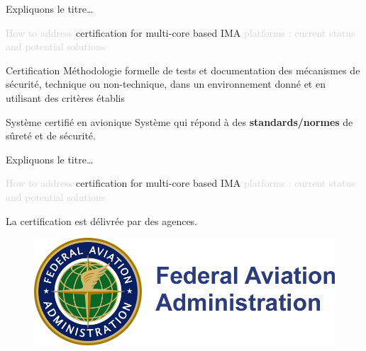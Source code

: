 \documentclass{beamer}
\begin{document}
\begin{frame}[t]{Expliquons le titre\ldots} 
  
  \begin{center}
    \begin{mdframed}[style=yellowbox]
      {\small\textcolor{lightgray}{How to address} certification for multi-core based IMA \textcolor{lightgray}{platforms :
       current status and potential solutions}}
       \end{mdframed}
  \end{center}
	
  	\begin{block}{Certification}
  		Méthodologie formelle de tests et documentation des mécanismes de sécurité,
		technique ou non-technique, dans un environnement donné et en utilisant des
		critères établis
  	\end{block}\pause

	\begin{block}{Système certifié en avionique}
	 Système qui répond à des \textbf{standards/normes} de sûreté et de sécurité.
	\end{block}


\end{frame}

\begin{frame}[t]{Expliquons le titre\ldots}
\begin{center}
    \begin{mdframed}[style=yellowbox]
      {\small\textcolor{lightgray}{How to address} certification for multi-core based IMA \textcolor{lightgray}{platforms :
       current status and potential solutions}}
       \end{mdframed}
  \end{center}

  La certification est délivrée par des agences.

  \begin{figure}
  	\centering
  	\includegraphics[width=0.8\linewidth]{federal.png}
  	\label{fig:federal}
  \end{figure}
  
\end{frame}
\end{document}

